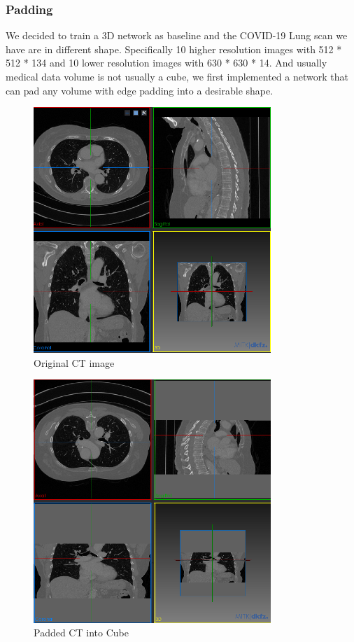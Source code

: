 \subsubsection*{Padding}
We decided to train a 3D network as baseline and the COVID-19 Lung scan we have are in different shape. Specifically 10 higher resolution images with 512 * 512 * 134 and 10 lower resolution images with 630 * 630 * 14. And usually medical data volume is not usually a cube, we first implemented a network that can pad any volume with edge padding into a desirable shape.
\begin{figure}
\centering
\includegraphics[width = 0.8\textwidth]{img/Original_ct.png}
\caption{Original CT image}
\label{fig:original}
\end{figure}

\begin{figure}
\centering
\includegraphics[width = 0.8\textwidth]{img/Padded_CT.png}
\caption{Padded CT into Cube}
\label{fig:padded}
\end{figure}

